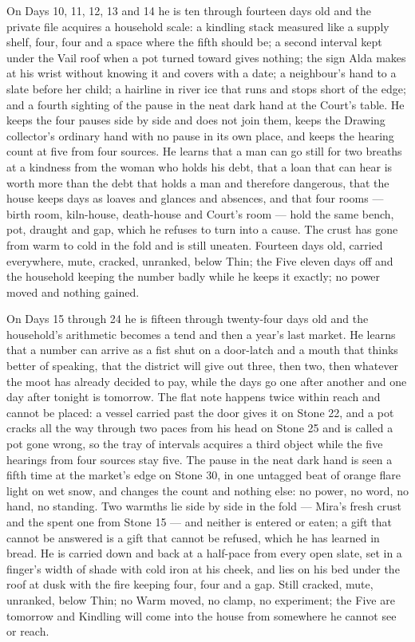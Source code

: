 \documentclass{design/chronicle}
\begin{document}
{On Days 10, 11, 12, 13 and 14 he is ten through fourteen days old and the private file acquires a household scale: a kindling stack measured like a supply shelf, four, four and a space where the fifth should be; a second interval kept under the Vail roof when a pot turned toward gives nothing; the sign Alda makes at his wrist without knowing it and covers with a date; a neighbour’s hand to a slate before her child; a hairline in river ice that runs and stops short of the edge; and a fourth sighting of the pause in the neat dark hand at the Court’s table. He keeps the four pauses side by side and does not join them, keeps the Drawing collector’s ordinary hand with no pause in its own place, and keeps the hearing count at five from four sources. He learns that a man can go still for two breaths at a kindness from the woman who holds his debt, that a loan that can hear is worth more than the debt that holds a man and therefore dangerous, that the house keeps days as loaves and glances and absences, and that four rooms --- birth room, kiln-house, death-house and Court’s room --- hold the same bench, pot, draught and gap, which he refuses to turn into a cause. The crust has gone from warm to cold in the fold and is still uneaten. Fourteen days old, carried everywhere, mute, cracked, unranked, below Thin; the Five eleven days off and the household keeping the number badly while he keeps it exactly; no power moved and nothing gained.

On Days 15 through 24 he is fifteen through twenty-four days old and the household’s arithmetic becomes a tend and then a year’s last market. He learns that a number can arrive as a fist shut on a door-latch and a mouth that thinks better of speaking, that the district will give out three, then two, then whatever the moot has already decided to pay, while the days go one after another and one day after tonight is tomorrow. The flat note happens twice within reach and cannot be placed: a vessel carried past the door gives it on Stone 22, and a pot cracks all the way through two paces from his head on Stone 25 and is called a pot gone wrong, so the tray of intervals acquires a third object while the five hearings from four sources stay five. The pause in the neat dark hand is seen a fifth time at the market’s edge on Stone 30, in one untagged beat of orange flare light on wet snow, and changes the count and nothing else: no power, no word, no hand, no standing. Two warmths lie side by side in the fold --- Mira’s fresh crust and the spent one from Stone 15 --- and neither is entered or eaten; a gift that cannot be answered is a gift that cannot be refused, which he has learned in bread. He is carried down and back at a half-pace from every open slate, set in a finger’s width of shade with cold iron at his cheek, and lies on his bed under the roof at dusk with the fire keeping four, four and a gap. Still cracked, mute, unranked, below Thin; no Warm moved, no clamp, no experiment; the Five are tomorrow and Kindling will come into the house from somewhere he cannot see or reach.

}
\end{document}

